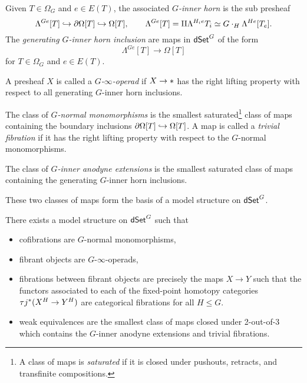\documentclass[a4paper,10pt
,draft
]{article}%
\renewcommand{\1}{\eta}%
\begin{document}
\begin{definition}
      Given $T \in \Omega_G$ and $e \in E(T)$, the associated \textit{$G$-inner horn} is the sub presheaf
      \[
            \Lambda^{Ge}[T] \hookrightarrow \partial \Omega[T] \hookrightarrow \Omega[T],
            \qquad
            \Lambda^{Ge}[T] = \amalg \Lambda^{H_i e}{T_i} \simeq G \cdot_H \Lambda^{He}[T_e].
      \]
      The \textit{generating $G$-inner horn inclusion} are maps in $\mathsf{dSet}^G$ of the form
      \[
            \Lambda^{Ge}[T] \to \Omega[T]
      \]
      for $T \in \Omega_G$ and $e \in E(T)$.

      A presheaf $X$ is called a \textit{$G$-$\infty$-operad} if $X \to \**$ has the right lifting property with respect to all generating $G$-inner horn inclusions.
\end{definition}

\begin{definition}
      The class of \textit{$G$-normal monomorphisms}
      is the smallest saturated\footnote{A class of maps is \textit{saturated} if it is closed under pushouts, retracts, and transfinite compositions.}
      class of maps containing the boundary inclusions $\partial \Omega[T] \hookrightarrow \Omega[T]$.
      A map is called a \textit{trivial fibration} if it has the right lifting property with respect to the $G$-normal monomorphisms.
      
      The class of \textit{$G$-inner anodyne extensions} is the smallest saturated class of maps containing the generating $G$-inner horn inclusions.
\end{definition}

These two classes of maps form the basis of a model structure on $\mathsf{dSet}^G$.

\begin{theorem}
      There exists a model structure on $\mathsf{dSet}^G$ such that
      \begin{itemize}
      \item cofibrations are $G$-normal monomorphisms,
      \item fibrant objects are $G$-$\infty$-operads,
      \item fibrations between fibrant objects are precisely the maps $X \to Y$ such that the functors associated to each of the fixed-point homotopy categories $\tau j^{\**}(X^H \to Y^H)$ are categorical fibrations for all $H \leq G$.
      \item weak equivalences are the smallest class of maps closed under 2-out-of-3 which
            contains the $G$-inner anodyne extensions and trivial fibrations.
      \end{itemize}
\end{theorem}
\end{document}
